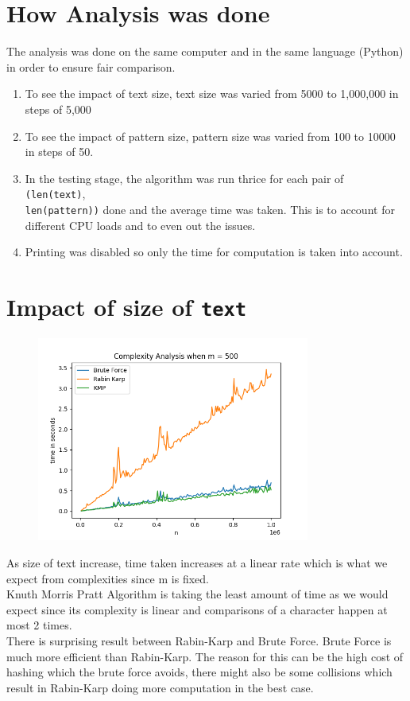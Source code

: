 \documentclass[a4paper, 12pt]{report}
\begin{document}
    \section{How Analysis was done}
    The analysis was done on the same computer and in the same language (Python) in order to ensure fair comparison.
    \begin{enumerate}
        \item To see the impact of text size, text size was varied from 5000 to 1,000,000 in steps of 5,000
        \item To see the impact of pattern size, pattern size was varied from 100 to 10000 in steps of 50.
        \item In the testing stage, the algorithm was run thrice for each pair of \texttt{(len(text)},\\ \texttt{len(pattern))} done and the average time was taken. This is to account for different CPU loads and to even out the issues.
        \item Printing was disabled so only the time for computation is taken into account.
    \end{enumerate}
    

    \section{Impact of size of \texttt{text}}
    \begin{figure}[H]
        \centering
        \includegraphics[width=0.8\textwidth]{n_analysis.png}
    \end{figure}
    As size of text increase, time taken increases at a linear rate which is what we expect from complexities since m is fixed. \\
Knuth Morris Pratt Algorithm is taking the least amount of time as we would expect since its complexity is linear and comparisons of a character happen at most 2 times. \\
There is surprising result between Rabin-Karp and Brute Force. Brute Force is much more efficient than Rabin-Karp. The reason for this can be the high cost of hashing which the brute force avoids, there might also be some collisions which result in Rabin-Karp doing more computation in the best case. 
\end{document}
